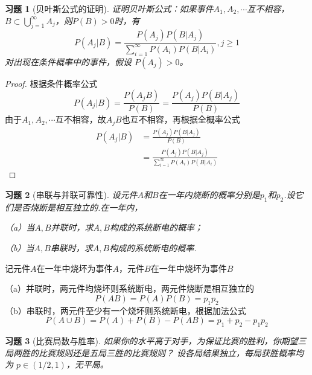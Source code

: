 \documentclass[UTF8,12pt,a4paper,fontset=fandol]{ctexart}
\newtheorem{exercise}{习题}[section]
\begin{document}
\begin{exercise}[贝叶斯公式的证明]\label{q:Y2.31}
证明贝叶斯公式：如果事件$A_1,A_2,\cdots$互不相容，$B\subset \bigcup\limits_{j = 1}^\infty  {{A_j}} $，则$P(B)>0$时，有
\[P({A_j}|B) = \frac{{P({A_j})P(B|{A_j})}}{{\sum\limits_{i = 1}^\infty  {P({A_i})P(B|{A_i})} }},j \geqslant 1\] 对出现在条件概率中的事件，假设 $P(A_j)>0$。\par{}
\end{exercise}

\begin{proof}\label{a:Y2.31}
根据条件概率公式
  \[P({A_j}|B) = \frac{{P({A_j}B)}}{{P(B)}} = \frac{{P({A_j})P(B|{A_j})}}{{P(B)}}\]
由于$A_1,A_2,\cdots$互不相容，故$A_jB$也互不相容，再根据全概率公式
\[\begin{aligned}P({A_j}|B) &= \frac{{P({A_j})P(B|{A_j})}}{{P(B)}} \\&= \frac{{P({A_j})P(B|{A_j})}}{{\sum\limits_{i = 1}^\infty  {P({A_i})P(B|{A_i})} }}\end{aligned}\]

\end{proof}

\begin{exercise}[串联与并联可靠性]\label{q:Y2.32}
设元件$A$和$B$在一年内烧断的概率分别是$p_1$和$p_2$.设它们是否烧断是相互独立的.在一年内，

（a）当$A,B$并联时，求$A,B$构成的系统断电的概率；

（b）当$A,B$串联时，求$A,B$构成的系统断电的概率.\par{}
\end{exercise}

\begin{solve}\label{a:Y2.32}
记元件$A$在一年中烧坏为事件$A$，元件$B$在一年中烧坏为事件$B$

（a）并联时，两元件均烧坏则系统断电，两元件烧断是相互独立的
\[P(AB) = P(A)P(B) = {p_1}{p_2}\]
（b）串联时，两元件至少有一个烧坏则系统断电，根据加法公式
\[P(A \cup B) = P(A) + P(B) - P(AB) = {p_1} + {p_2} - {p_1}{p_2}\]
\end{solve}

\begin{exercise}[比赛局数与胜率]\label{q:Y2.33}
如果你的水平高于对手，为保证比赛的胜利，你期望三局两胜的比赛规则还是五局三胜的比赛规则？ 设各局结果独立，每局获胜概率均为 $p\in(1/2,1)$，无平局。\par{}
\end{exercise}
\end{document}
